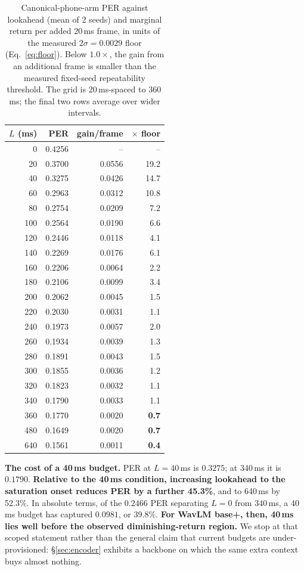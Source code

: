 \documentclass[journal]{IEEEtran}
\begin{document}
\begin{table}[t]
\centering\small
\caption{Canonical-phone-arm PER against lookahead (mean of 2 seeds) and marginal
return per added 20\,ms frame, in units of the measured $2\sigma{=}0.0029$
floor (Eq.~\ref{eq:floor}). Below $1.0\times$, the gain from an additional
frame is smaller than the measured fixed-seed repeatability threshold. The grid is 20\,ms-spaced to 360\,ms; the final two rows
average over wider intervals.}
\label{tab:dense}
\begin{tabular}{rrrr}
\toprule
$L$ (ms) & PER & gain/frame & $\times$ floor \\
\midrule
0   & 0.4256 & --      & -- \\
20  & 0.3700 & 0.0556  & 19.2 \\
40  & 0.3275 & 0.0426  & 14.7 \\
60  & 0.2963 & 0.0312  & 10.8 \\
80  & 0.2754 & 0.0209  & 7.2 \\
100 & 0.2564 & 0.0190  & 6.6 \\
120 & 0.2446 & 0.0118  & 4.1 \\
140 & 0.2269 & 0.0176  & 6.1 \\
160 & 0.2206 & 0.0064  & 2.2 \\
180 & 0.2106 & 0.0099  & 3.4 \\
200 & 0.2062 & 0.0045  & 1.5 \\
220 & 0.2030 & 0.0031  & 1.1 \\
240 & 0.1973 & 0.0057  & 2.0 \\
260 & 0.1934 & 0.0039  & 1.3 \\
280 & 0.1891 & 0.0043  & 1.5 \\
300 & 0.1855 & 0.0036  & 1.2 \\
320 & 0.1823 & 0.0032  & 1.1 \\
340 & 0.1790 & 0.0033  & 1.1 \\
360 & 0.1770 & 0.0020  & \textbf{0.7} \\
480 & 0.1649 & 0.0020  & \textbf{0.7} \\
640 & 0.1561 & 0.0011  & \textbf{0.4} \\
\bottomrule
\end{tabular}
\end{table}

\textbf{The cost of a 40\,ms budget.} PER at $L{=}40$\,ms is $0.3275$; at
340\,ms it is $0.1790$. \textbf{Relative to the 40\,ms condition, increasing
lookahead to the saturation onset reduces PER by a further 45.3\%}, and to
640\,ms by 52.3\%. In absolute terms, of the $0.2466$ PER separating $L{=}0$
from $340$\,ms, a 40\,ms budget has captured $0.0981$, or $39.8\%$.
\textbf{For WavLM base+, then, 40\,ms lies well before the observed
diminishing-return region.} We stop at that scoped statement rather than the
general claim that current budgets are under-provisioned: \S\ref{sec:encoder}
exhibits a backbone on which the same extra context buys almost nothing.
\end{document}
